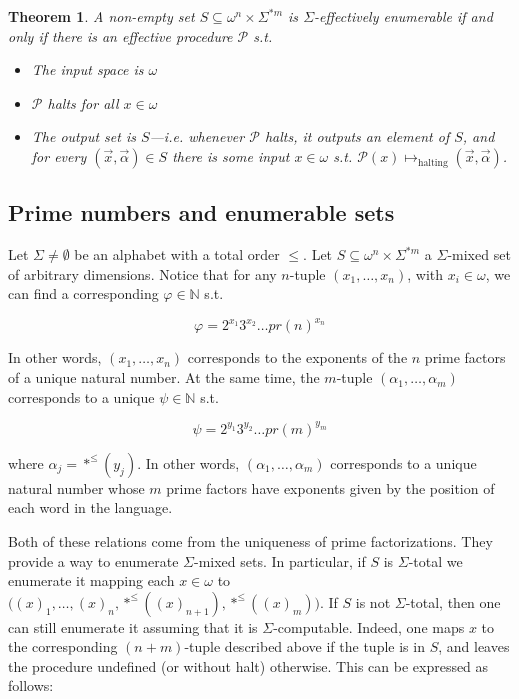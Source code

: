 \documentclass[a4paper, 12pt]{article}
\newtheorem{theorem}{Theorem}
\newtheorem{theorem}{Theorem}
\begin{document}
\begin{theorem}
    A non-empty set $S \subseteq \omega^n \times \Sigma^{*m}$ is
    $\Sigma$-effectively enumerable if and only if there is an effective
    procedure $\mathcal{P}$ s.t. 

    \begin{itemize}
        \item The input space is $\omega$
        \item $\mathcal{P}$ halts for all $x \in \omega$ 
        \item The output set is $S$---i.e. whenever $\mathcal{P}$ halts, it
            outputs an element of $S$, and for every $(\overrightarrow{x},
            \overrightarrow{\alpha}) \in S$ there is some input $x \in \omega$
        s.t. $\mathcal{P}(x) \mapsto_{\text{halting}} (\overrightarrow{x},
        \overrightarrow{\alpha})$.
    \end{itemize}
\end{theorem}

\subsection{Prime numbers and enumerable sets}

Let $\Sigma \neq \emptyset$ be an alphabet with a total order $\leq$. Let $S
\subseteq \omega^{n} \times \Sigma^{*m}$ a $\Sigma$-mixed set of arbitrary
dimensions. Notice that for any $n$-tuple $(x_1, \ldots, x_n)$, with $x_i \in
\omega$, we can find a corresponding $\varphi \in \mathbb{N}$ s.t. 

$$
\varphi = 2^{x_1}3^{x_2} \ldots pr(n)^{x_n}
$$

In other words, $(x_1, \ldots, x_n)$ corresponds to the exponents of the $n$
prime factors of a unique natural number. At the same time, the $m$-tuple
$(\alpha_1, \ldots, \alpha_m)$ corresponds to a unique $\psi \in \mathbb{N}$
s.t. 

$$
\psi = 2^{y_1}3^{y_2}\ldots pr(m)^{y_m}
$$

where $\alpha_j = *^{\leq}(y_j)$. In other words, $(\alpha_1, \ldots, \alpha_m)$
corresponds to a unique natural number whose $m$ prime factors have exponents
given by the position of each word in the language.

Both of these relations come from the uniqueness of prime factorizations.
They provide a way to enumerate $\Sigma$-mixed sets. In
particular, if $S$ is $\Sigma$-total we enumerate it mapping each $x \in \omega$
to $\big((x)_1, \ldots, (x)_n, *^{\leq}((x)_{n+1}), *^{\leq}((x)_m)\big)$. If
$S$ is not $\Sigma$-total, then one can still enumerate it assuming that it is
$\Sigma$-computable. Indeed, one maps $x$ to the corresponding $(n+m)$-tuple
described above if the tuple is in $S$, and leaves the procedure undefined (or
without halt) otherwise. This can be expressed as follows:
\end{document}
